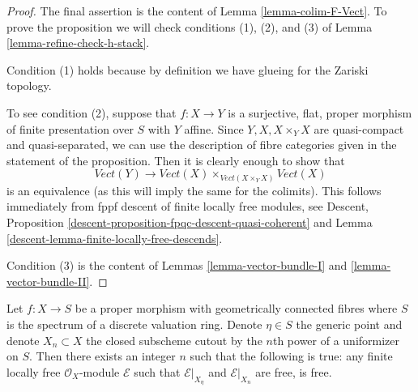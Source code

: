 \begin{proof}
The final assertion is the content of Lemma \ref{lemma-colim-F-Vect}.
To prove the proposition we will check conditions (1), (2), and (3) of
Lemma \ref{lemma-refine-check-h-stack}.

\medskip\noindent
Condition (1) holds because by definition we have glueing
for the Zariski topology.

\medskip\noindent
To see condition (2), suppose that $f : X \to Y$ is a surjective,
flat, proper morphism of finite presentation over $S$ with $Y$ affine.
Since $Y, X, X \times_Y X$ are quasi-compact and quasi-separated,
we can use the description of fibre categories given in the
statement of the proposition. Then it is clearly enough to
show that
$$
\textit{Vect}(Y)
\longrightarrow
\textit{Vect}(X)
\times_{\textit{Vect}(X \times_Y X)}
\textit{Vect}(X)
$$
is an equivalence (as this will imply the same for the colimits).
This follows immediately from fppf descent of finite locally free modules, see
Descent, Proposition \ref{descent-proposition-fpqc-descent-quasi-coherent} and
Lemma \ref{descent-lemma-finite-locally-free-descends}.

\medskip\noindent
Condition (3) is the content of
Lemmas \ref{lemma-vector-bundle-I} and \ref{lemma-vector-bundle-II}.
\end{proof}

\begin{lemma}
\label{lemma-trivial-fibres-dvr}
Let $f : X \to S$ be a proper morphism with geometrically connected fibres
where $S$ is the spectrum of a discrete valuation ring. Denote $\eta \in S$
the generic point and denote $X_n \subset X$ the closed subscheme
cutout by the $n$th power of a uniformizer on $S$.
Then there exists
an integer $n$ such that the following is true: any finite
locally free $\mathcal{O}_X$-module $\mathcal{E}$
such that $\mathcal{E}|_{X_\eta}$ and $\mathcal{E}|_{X_n}$
are free, is free.
\end{lemma}

